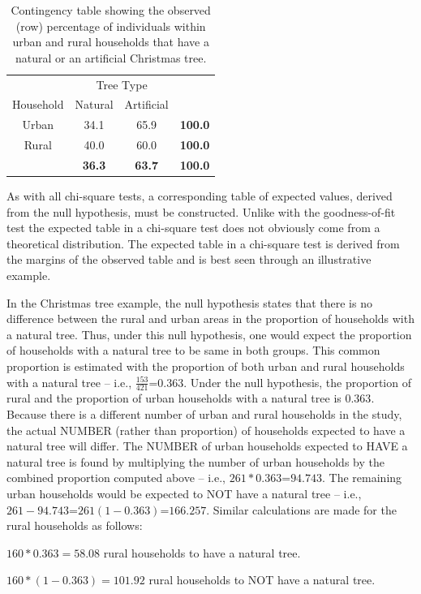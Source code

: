 \documentclass[10pt,openany]{book}\usepackage[]{graphicx}\usepackage[]{color}
\begin{document}
\begin{table}[htbp]
  \centering
  \caption{Contingency table showing the observed (row) percentage of individuals within urban and rural households that have a natural or an artificial Christmas tree.}\label{tab:ChiTreeObsProp}
    \begin{tabular}{c|c|c|c|}
      \multicolumn{1}{c}{} & \multicolumn{2}{c}{Tree Type} & \multicolumn{1}{c}{} \\
      \cline{2-3}
      Household & Natural & Artificial & \multicolumn{1}{c}{} \\
      \hline
      \multicolumn{1}{|c|}{Urban} & 34.1 & 65.9 & \textbf{100.0} \\
      \hline
      \multicolumn{1}{|c|}{Rural} & 40.0 & 60.0 & \textbf{100.0} \\
      \hline
       & \textbf{36.3} & \textbf{63.7} & \textbf{100.0} \\
      \cline{2-4}
    \end{tabular}
\end{table}

As with all chi-square tests, a corresponding table of expected values, derived from the null hypothesis, must be constructed.  Unlike with the goodness-of-fit test the expected table in a chi-square test does not obviously come from a theoretical distribution.  The expected table in a chi-square test is derived from the margins of the observed table and is best seen through an illustrative example.

In the Christmas tree example, the null hypothesis states that there is no difference between the rural and urban areas in the proportion of households with a natural tree.  Thus, under this null hypothesis, one would expect the proportion of households with a natural tree to be same in both groups.  This common proportion is estimated with the proportion of both urban and rural households with a natural tree -- i.e., $\frac{153}{421}$=$0.363$.  Under the null hypothesis, the proportion of rural and the proportion of urban households with a natural tree is $0.363$.  Because there is a different number of urban and rural households in the study, the actual NUMBER (rather than proportion) of households expected to have a natural tree will differ.  The NUMBER of urban households expected to HAVE a natural tree is found by multiplying the number of urban households by the combined proportion computed above -- i.e., $261*0.363$=$94.743$.  The remaining urban households would be expected to NOT have a natural tree -- i.e., $261-94.743$=$261(1-0.363)$=$166.257$.  Similar calculations are made for the rural households as follows:
\begin{Itemize}
  \item $160*0.363=58.08$ rural households to have a natural tree.
  \item $160*(1-0.363)=101.92$ rural households to NOT have a natural tree.
\end{Itemize}
\end{document}
